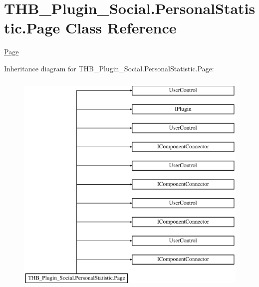\hypertarget{class_t_h_b___plugin___social_1_1_personal_statistic_1_1_page}{}\section{T\+H\+B\+\_\+\+Plugin\+\_\+\+Social.\+Personal\+Statistic.\+Page Class Reference}
\label{class_t_h_b___plugin___social_1_1_personal_statistic_1_1_page}


\mbox{\hyperlink{class_t_h_b___plugin___social_1_1_personal_statistic_1_1_page}{Page}}  


Inheritance diagram for T\+H\+B\+\_\+\+Plugin\+\_\+\+Social.\+Personal\+Statistic.\+Page\+:\begin{figure}[H]
\begin{center}
\leavevmode
\includegraphics[height=11.000000cm]{d9/d9e/class_t_h_b___plugin___social_1_1_personal_statistic_1_1_page}
\end{center}
\end{figure}
